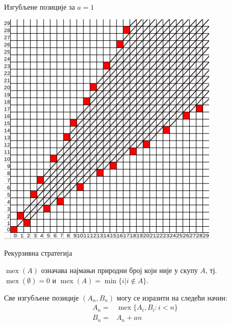 \documentclass[10pt]{beamer}
\DeclareMathOperator{\mex}{mex}
\begin{document}
\begin{frame}{Изгубљене позиције за $ a = 1 $}
\begin{center}
\begin{minipage}[t]{.80\linewidth}
				\includegraphics[width=0.8\textwidth]{../src/statistics/picture/p_positions_a=1.png}
			\end{minipage}
		\end{center}
	\end{frame}
	
	\begin{frame}{Рекурзивна стратегија}
		\begin{tcolorbox}[title=Дефиниција оператора $ \mex $]
			$\mex(A)$ означава најмањи природни број који није у скупу $ A $, тј. $ \mex(\emptyset)=0 $ и
			$ \mex(A)=\min\{i | i\notin A\} $.
		\end{tcolorbox}
	
	    \begin{tcolorbox}[title=Рекурзивна карактеризација изгубљених позиција]
	    	Све изгубљене позиције $ (A_{n}, B_{n}) $ могу се изразити на следећи начин:
	    	\begin{eqnarray*}
		    	&A_{n} = &\mex \{ A_{i}, B_{i} : i < n \}\\
		    	&B_{n} = &A_{n} + an
	    	\end{eqnarray*}
	   	\end{tcolorbox}
	\end{frame}
\end{document}
